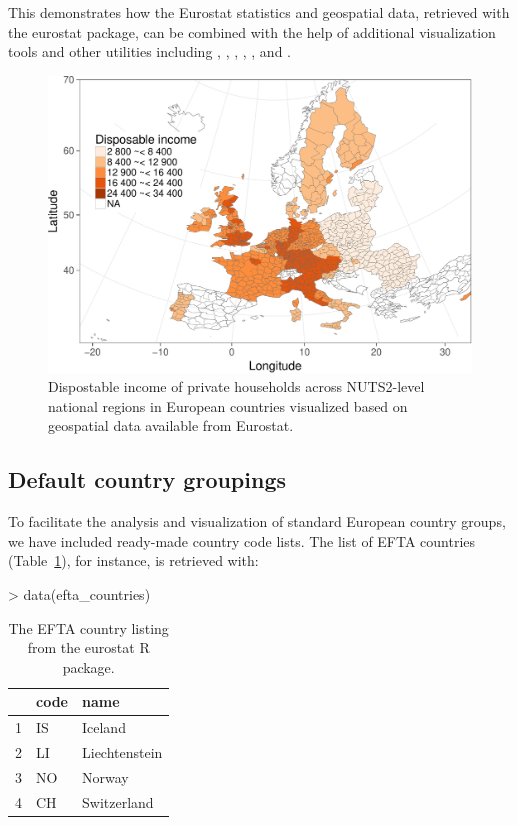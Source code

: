 This demonstrates how the Eurostat statistics and geospatial data,
retrieved with the eurostat package, can be combined with the help of
additional visualization tools and other utilities including
 \citep{grid},  \citep{maptools},  \citep{rgdal},
 \citep{rgeos},  \citep{scales}, and
 \citep{stringr}.

\begin{figure}
\begin{center}
\includegraphics{2015-manu-mapexample-1}
\caption{Dispostable income of private households across NUTS2-level national regions in European countries visualized based on geospatial data available from Eurostat.}
\label{fig:mapexample}
\end{center}
\end{figure}


\subsection{Default country groupings}

To facilitate the analysis and visualization of standard European
country groups, we have included ready-made country code lists. The
list of EFTA countries (Table~\ref{tab:efta}), for instance, is
retrieved with:

\begin{example}
> data(efta_countries)
\end{example}

\begin{table}[h]
\centering
\begin{tabular}{rll}
\toprule
  \hline
  & code & name \\ 
  \hline
  1 & IS & Iceland \\ 
  2 & LI & Liechtenstein \\ 
  3 & NO & Norway \\ 
  4 & CH & Switzerland \\ 
   \hline
\bottomrule   
\end{tabular}
\caption{The EFTA country listing from the eurostat R package.}
\label{tab:efta}
\end{table}

